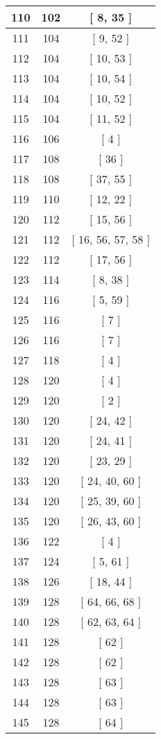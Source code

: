 \begin{center}
\begin{longtable}[H]{|| c c c ||}
\hline
110 & 102 & [ 8, 35 ] \\ 
\hline
111 & 104 & [ 9, 52 ] \\ 
\hline
112 & 104 & [ 10, 53 ] \\ 
\hline
113 & 104 & [ 10, 54 ] \\ 
\hline
114 & 104 & [ 10, 52 ] \\ 
\hline
115 & 104 & [ 11, 52 ] \\ 
\hline
116 & 106 & [ 4 ] \\ 
\hline
117 & 108 & [ 36 ] \\ 
\hline
118 & 108 & [ 37, 55 ] \\ 
\hline
119 & 110 & [ 12, 22 ] \\ 
\hline
120 & 112 & [ 15, 56 ] \\ 
\hline
121 & 112 & [ 16, 56, 57, 58 ] \\ 
\hline
122 & 112 & [ 17, 56 ] \\ 
\hline
123 & 114 & [ 8, 38 ] \\ 
\hline
124 & 116 & [ 5, 59 ] \\ 
\hline
125 & 116 & [ 7 ] \\ 
\hline
126 & 116 & [ 7 ] \\ 
\hline
127 & 118 & [ 4 ] \\ 
\hline
128 & 120 & [ 4 ] \\ 
\hline
129 & 120 & [ 2 ] \\ 
\hline
130 & 120 & [ 24, 42 ] \\ 
\hline
131 & 120 & [ 24, 41 ] \\ 
\hline
132 & 120 & [ 23, 29 ] \\ 
\hline
133 & 120 & [ 24, 40, 60 ] \\ 
\hline
134 & 120 & [ 25, 39, 60 ] \\ 
\hline
135 & 120 & [ 26, 43, 60 ] \\ 
\hline
136 & 122 & [ 4 ] \\ 
\hline
137 & 124 & [ 5, 61 ] \\ 
\hline
138 & 126 & [ 18, 44 ] \\ 
\hline
139 & 128 & [ 64, 66, 68 ] \\ 
\hline
140 & 128 & [ 62, 63, 64 ] \\ 
\hline
141 & 128 & [ 62 ] \\ 
\hline
142 & 128 & [ 62 ] \\ 
\hline
143 & 128 & [ 63 ] \\ 
\hline
144 & 128 & [ 63 ] \\ 
\hline
145 & 128 & [ 64 ] \\ 

\end{longtable}
\end{center}

